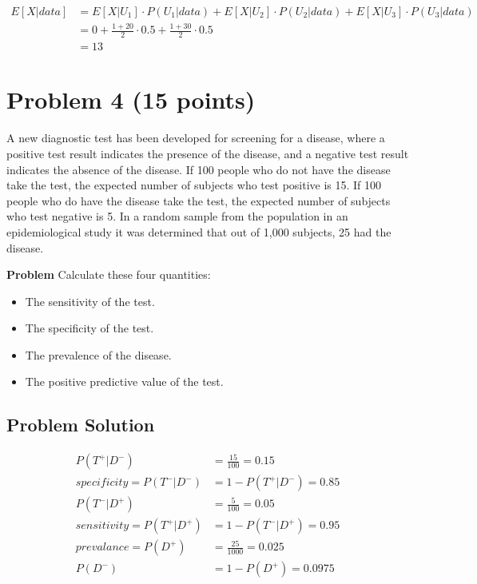 \documentclass[12pt]{article}
\theoremstyle{definition}
\begin{document}
\begin{align*}
E[X|data] &= E[X|U_1] \cdot P(U_1|data) + E[X|U_2] \cdot P(U_2|data) + E[X|U_3] \cdot P(U_3|data)\\
&= 0 +  \frac{1 + 20}{2} \cdot 0.5 +  \frac{1 + 30}{2} \cdot 0.5\\
&= 13
\end{align*}











\newpage
\section*{Problem 4 (15 points)}

A new diagnostic test has been developed for screening for a disease, where a positive test result indicates the presence of the disease, and a negative test result indicates the absence of the disease. If 100 people who do not have the disease take the test, the expected number of subjects who test positive is 15. If 100 people who do have the disease take the test, the expected number of subjects who test negative is 5. In a random sample from the population in an epidemiological study it was determined that out of 1,000 subjects, 25 had the disease.

\bigskip
\noindent
{\bf Problem} Calculate these four quantities:
\begin{itemize}
	\item The sensitivity of the test.
	\item The specificity of the test.
	\item The prevalence of the disease.
	\item The positive predictive value of the test.
\end{itemize}

\subsection*{Problem Solution}
\begin{align*}
P(T^+|D^-) &= \frac{15}{100} = 0.15\\
specificity = P(T^-|D^-) &= 1 - P(T^+|D^-) = 0.85\\
P(T^-|D^+) &= \frac{5}{100} = 0.05\\
sensitivity = P(T^+|D^+) &= 1 - P(T^-|D^+) = 0.95\\
prevalance = P(D^+) &= \frac{25}{1000} = 0.025\\
P(D^-) &= 1 - P(D^+) = 0.0975\\
\end{align*}
\end{document}

